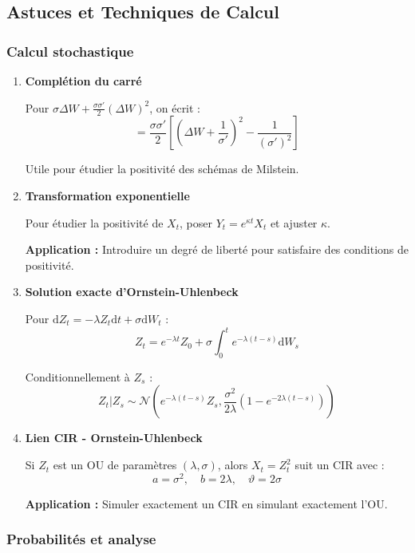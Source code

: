 \documentclass[12pt,a4paper]{article}
\theoremstyle{definition}
\theoremstyle{remark}
\newcommand{\dd}{\mathrm{d}}
\begin{document}
\subsection{Astuces et Techniques de Calcul}

\subsubsection{Calcul stochastique}

\begin{enumerate}
\item \textbf{Complétion du carré}

Pour $\sigma\Delta W + \frac{\sigma\sigma'}{2}(\Delta W)^2$, on écrit :
\[
= \frac{\sigma\sigma'}{2}\left[\left(\Delta W + \frac{1}{\sigma'}\right)^2 - \frac{1}{(\sigma')^2}\right]
\]

Utile pour étudier la positivité des schémas de Milstein.

\item \textbf{Transformation exponentielle}

Pour étudier la positivité de $X_t$, poser $Y_t = e^{\kappa t}X_t$ et ajuster $\kappa$.

\textbf{Application :} Introduire un degré de liberté pour satisfaire des conditions de positivité.

\item \textbf{Solution exacte d'Ornstein-Uhlenbeck}

Pour $\dd Z_t = -\lambda Z_t \dd t + \sigma\dd W_t$ :
\[
Z_t = e^{-\lambda t}Z_0 + \sigma\int_0^t e^{-\lambda(t-s)}\dd W_s
\]

Conditionnellement à $Z_s$ :
\[
Z_t | Z_s \sim \mathcal{N}\left(e^{-\lambda(t-s)}Z_s, \frac{\sigma^2}{2\lambda}(1 - e^{-2\lambda(t-s)})\right)
\]

\item \textbf{Lien CIR - Ornstein-Uhlenbeck}

Si $Z_t$ est un OU de paramètres $(\lambda, \sigma)$, alors $X_t = Z_t^2$ suit un CIR avec :
\[
a = \sigma^2, \quad b = 2\lambda, \quad \vartheta = 2\sigma
\]

\textbf{Application :} Simuler exactement un CIR en simulant exactement l'OU.
\end{enumerate}

\subsubsection{Probabilités et analyse}
\end{document}
